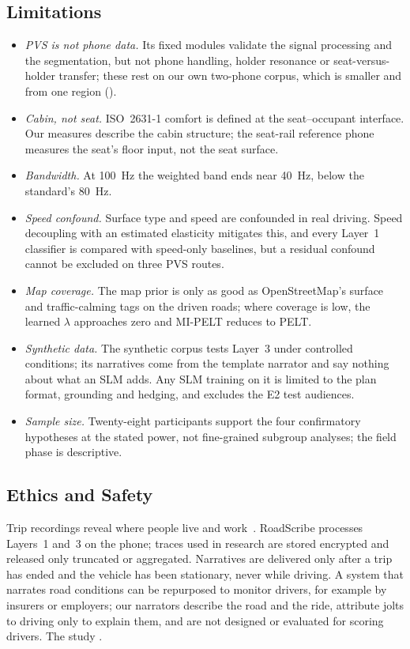 \subsection{Limitations}
\label{sec:limits}

\begin{itemize}
\item \emph{PVS is not phone data.} Its fixed modules validate the signal processing and the segmentation, but not phone handling, holder resonance or seat-versus-holder transfer; these rest on our own two-phone corpus, which is smaller and from one region (\TBD{}).
\item \emph{Cabin, not seat.} ISO~2631-1 comfort is defined at the seat--occupant interface. Our measures describe the cabin structure; the seat-rail reference phone measures the seat's floor input, not the seat surface.
\item \emph{Bandwidth.} At 100~Hz the weighted band ends near 40~Hz, below the standard's 80~Hz.
\item \emph{Speed confound.} Surface type and speed are confounded in real driving. Speed decoupling with an estimated elasticity mitigates this, and every Layer~1 classifier is compared with speed-only baselines, but a residual confound cannot be excluded on three PVS routes.
\item \emph{Map coverage.} The map prior is only as good as OpenStreetMap's surface and traffic-calming tags on the driven roads; where coverage is low, the learned $\lambda$ approaches zero and MI-PELT reduces to PELT.
\item \emph{Synthetic data.} The synthetic corpus tests Layer~3 under controlled conditions; its narratives come from the template narrator and say nothing about what an SLM adds. Any SLM training on it is limited to the plan format, grounding and hedging, and excludes the E2 test audiences.
\item \emph{Sample size.} Twenty-eight participants support the four confirmatory hypotheses at the stated power, not fine-grained subgroup analyses; the field phase is descriptive.
\end{itemize}

\subsection{Ethics and Safety}
\label{sec:ethics}
Trip recordings reveal where people live and work~\cite{demontjoye2013unique}.
RoadScribe processes Layers~1 and~3 on the phone; traces used in research are stored encrypted and released only truncated or aggregated.
Narratives are delivered only after a trip has ended and the vehicle has been stationary, never while driving.
A system that narrates road conditions can be repurposed to monitor drivers, for example by insurers or employers; our narrators describe the road and the ride, attribute jolts to driving only to explain them, and are not designed or evaluated for scoring drivers.
The study .

